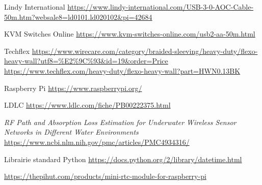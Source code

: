 \begin{thebibliographyUL}{9}
 Lindy International \url{https://www.lindy-international.com/USB-3-0-AOC-Cable-50m.htm?websale8=ld0101.ld020102&pi=42684}

 KVM Switches Online \url{https://www.kvm-switches-online.com/usb2-aa-50m.html}

 Techflex \url{https://www.wirecare.com/category/braided-sleeving/heavy-duty/flexo-heavy-wall?utf8=\%E2\%9C\%93&id=19&order=Price} \url{https://www.techflex.com/heavy-duty/flexo-heavy-wall?part=HWN0.13BK}

 Raspberry Pi \url{https://www.raspberrypi.org/}

 LDLC \url{https://www.ldlc.com/fiche/PB00222375.html}

 \emph{RF Path and Absorption Loss Estimation for Underwater Wireless Sensor Networks in Different Water Environments} \url{https://www.ncbi.nlm.nih.gov/pmc/articles/PMC4934316/}

 Librairie standard Python \url{https://docs.python.org/2/library/datetime.html}

 \url{https://thepihut.com/products/mini-rtc-module-for-raspberry-pi}

\end{thebibliographyUL}